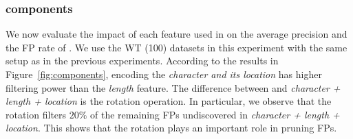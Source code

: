 
\subsubsection{\hash components}

We now evaluate the impact of each feature used in \hash on the average precision and the FP rate of \system.
We use the WT (100) datasets in this experiment with the same setup as in the previous experiments.
According to the results in Figure~\ref{fig:components}, encoding the \textit{character and its location} has higher filtering power than the \textit{length} feature.
The difference between \hash and \textit{character + length + location} is the rotation operation.
In particular, we observe that the rotation filters $20\%$ of the remaining FPs undiscovered in \textit{character + length + location}.
This shows that the rotation plays an important role in pruning FPs.

